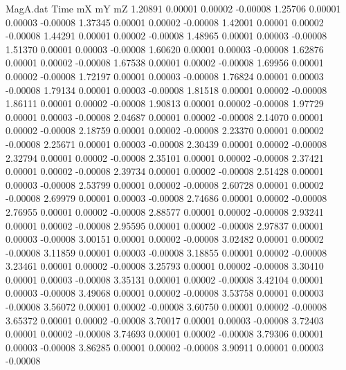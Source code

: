\begin{filecontents}{MagA.dat}
Time mX mY mZ
   1.20891    0.00001    0.00002   -0.00008
   1.25706    0.00001    0.00003   -0.00008
   1.37345    0.00001    0.00002   -0.00008
   1.42001    0.00001    0.00002   -0.00008
   1.44291    0.00001    0.00002   -0.00008
   1.48965    0.00001    0.00003   -0.00008
   1.51370    0.00001    0.00003   -0.00008
   1.60620    0.00001    0.00003   -0.00008
   1.62876    0.00001    0.00002   -0.00008
   1.67538    0.00001    0.00002   -0.00008
   1.69956    0.00001    0.00002   -0.00008
   1.72197    0.00001    0.00003   -0.00008
   1.76824    0.00001    0.00003   -0.00008
   1.79134    0.00001    0.00003   -0.00008
   1.81518    0.00001    0.00002   -0.00008
   1.86111    0.00001    0.00002   -0.00008
   1.90813    0.00001    0.00002   -0.00008
   1.97729    0.00001    0.00003   -0.00008
   2.04687    0.00001    0.00002   -0.00008
   2.14070    0.00001    0.00002   -0.00008
   2.18759    0.00001    0.00002   -0.00008
   2.23370    0.00001    0.00002   -0.00008
   2.25671    0.00001    0.00003   -0.00008
   2.30439    0.00001    0.00002   -0.00008
   2.32794    0.00001    0.00002   -0.00008
   2.35101    0.00001    0.00002   -0.00008
   2.37421    0.00001    0.00002   -0.00008
   2.39734    0.00001    0.00002   -0.00008
   2.51428    0.00001    0.00003   -0.00008
   2.53799    0.00001    0.00002   -0.00008
   2.60728    0.00001    0.00002   -0.00008
   2.69979    0.00001    0.00003   -0.00008
   2.74686    0.00001    0.00002   -0.00008
   2.76955    0.00001    0.00002   -0.00008
   2.88577    0.00001    0.00002   -0.00008
   2.93241    0.00001    0.00002   -0.00008
   2.95595    0.00001    0.00002   -0.00008
   2.97837    0.00001    0.00003   -0.00008
   3.00151    0.00001    0.00002   -0.00008
   3.02482    0.00001    0.00002   -0.00008
   3.11859    0.00001    0.00003   -0.00008
   3.18855    0.00001    0.00002   -0.00008
   3.23461    0.00001    0.00002   -0.00008
   3.25793    0.00001    0.00002   -0.00008
   3.30410    0.00001    0.00003   -0.00008
   3.35131    0.00001    0.00002   -0.00008
   3.42104    0.00001    0.00003   -0.00008
   3.49068    0.00001    0.00002   -0.00008
   3.53758    0.00001    0.00003   -0.00008
   3.56072    0.00001    0.00002   -0.00008
   3.60750    0.00001    0.00002   -0.00008
   3.65372    0.00001    0.00002   -0.00008
   3.70017    0.00001    0.00003   -0.00008
   3.72403    0.00001    0.00002   -0.00008
   3.74693    0.00001    0.00002   -0.00008
   3.79306    0.00001    0.00003   -0.00008
   3.86285    0.00001    0.00002   -0.00008
   3.90911    0.00001    0.00003   -0.00008

\end{filecontents}
